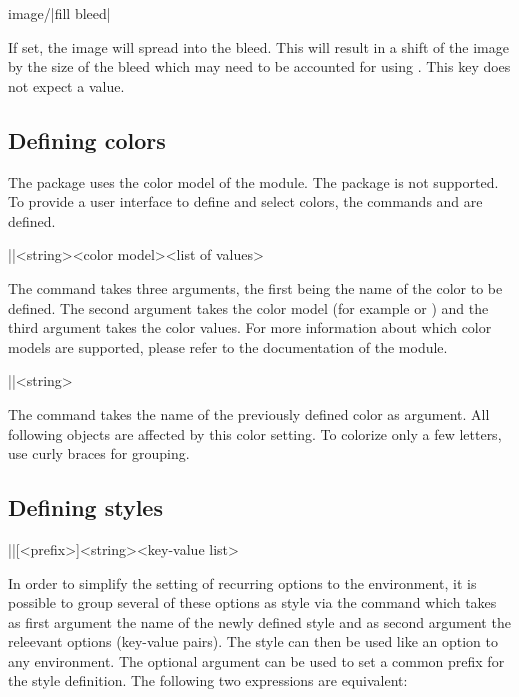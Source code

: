 \documentclass[a4paper]{article}
\begin{document}
\begin{macrodef}
image/|fill bleed|
\end{macrodef}
If set, the image will spread into the bleed. This will result in a shift of the image by the size of the bleed which may need to be accounted for using . This key does not expect a value.

\subsection{Defining colors}

The package uses the color model of the  module. The  package is not supported. To provide a user interface to define and select colors, the commands \macro{\leporellocolordefine} and \macro{\leporellocolorselect} are defined.

\begin{macrodef}
|\leporellocolordefine|{<string>}{<color model>}{<list of values>}
\end{macrodef}
The command \macro{\leporellocolordefine} takes three arguments, the first being the name of the color to be defined. The second argument takes the color model (for example  or ) and the third argument takes the color values. For more information about which color models are supported, please refer to the documentation of the  module.

\begin{macrodef}
|\leporellocolorselect|{<string>}
\end{macrodef}
The command \macro{\leporellocolorselect} takes the name of the previously defined color as argument. All following objects are affected by this color setting. To colorize only a few letters, use curly braces for grouping.

\subsection{Defining styles}

\begin{macrodef}
|\leporellosetstyle|[<prefix>]{<string>}{<key-value list>}
\end{macrodef}
In order to simplify the setting of recurring options to the  environment, it is possible to group several of these options as style via the \macro{\leporellosetstyle} command which takes as first argument the name of the newly defined style and as second argument the releevant options (key-value pairs). The style can then be used like an option to any  environment. The optional argument can be used to set a common prefix for the style definition. The following two expressions are equivalent:
\end{document}
